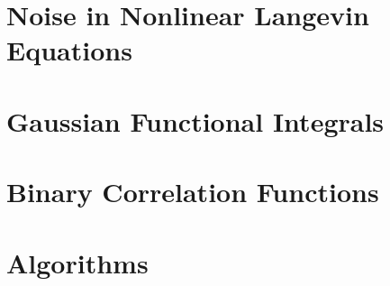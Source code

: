\documentclass[12pt, letterpaper]{report}
\begin{document}
\appendix

\chapter{Noise in Nonlinear Langevin Equations}


\chapter{Gaussian Functional Integrals}


\chapter{Binary Correlation Functions}
\label{binaryCs}


\chapter{Algorithms}


\printbibliography
\end{document}
